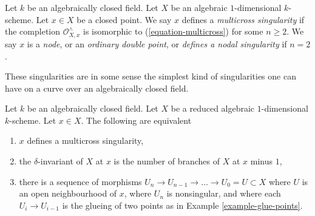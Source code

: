 \begin{definition}
\label{definition-multicross}
Let $k$ be an algebraically closed field. Let $X$ be an algebraic
$1$-dimensional $k$-scheme. Let $x \in X$ be a closed point.
We say $x$ defines a {\it multicross singularity} if the completion
$\mathcal{O}_{X, x}^\wedge$
is isomorphic to (\ref{equation-multicross}) for some $n \geq 2$.
We say $x$ is a {\it node}, or an {\it ordinary double point}, or
{\it defines a nodal singularity} if $n = 2$.
\end{definition}

\noindent
These singularities are in some sense the simplest kind of singularities
one can have on a curve over an algebraically closed field.

\begin{lemma}
\label{lemma-multicross}
Let $k$ be an algebraically closed field. Let $X$ be a reduced algebraic
$1$-dimensional $k$-scheme. Let $x \in X$. The following are equivalent
\begin{enumerate}
\item $x$ defines a multicross singularity,
\item the $\delta$-invariant of $X$ at $x$ is the
number of branches of $X$ at $x$ minus $1$,
\item there is a sequence of morphisms
$U_n \to U_{n - 1} \to \ldots \to U_0 = U \subset X$
where $U$ is an open neighbourhood of $x$, where
$U_n$ is nonsingular, and where each $U_i \to U_{i - 1}$
is the glueing of two points as in Example \ref{example-glue-points}.
\end{enumerate}
\end{lemma}

